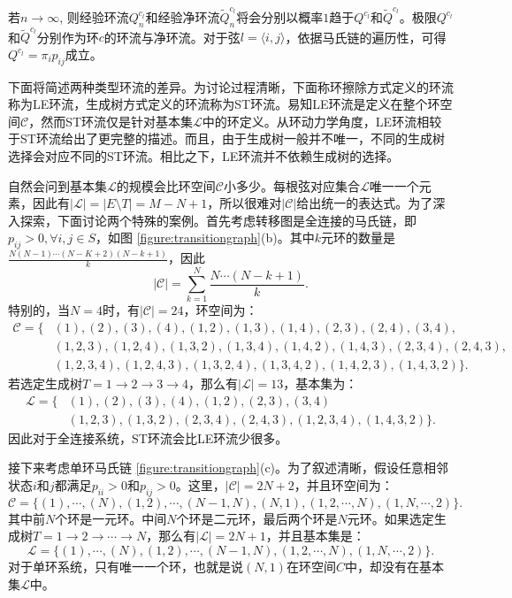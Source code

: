 若$n \to \infty$, 则经验环流$Q_n^{c_l}$和经验净环流$\tilde{Q}_n^{c_l}$将会分别以概率$1$趋于$Q^{c_l}$和$\tilde{Q}^{c_l}$。极限$Q^{c_l}$和$\tilde{Q}^{c_l}$分别作为环$c$的环流与净环流。对于弦$l=\langle i,j \rangle$，依据马氏链的遍历性，可得$Q^{c_l} = \pi_i p_{ij}$成立。

下面将简述两种类型环流的差异。为讨论过程清晰，下面称环擦除方式定义的环流称为LE环流，生成树方式定义的环流称为ST环流。易知LE环流是定义在整个环空间$\mathcal{C}$，然而ST环流仅是针对基本集$\mathcal{L}$中的环定义。从环动力学角度，LE环流相较于ST环流给出了更完整的描述。而且，由于生成树一般并不唯一，不同的生成树选择会对应不同的ST环流。相比之下，LE环流并不依赖生成树的选择。

自然会问到基本集$\mathcal{L}$的规模会比环空间$\mathcal{C}$小多少。每根弦对应集合$\mathcal{L}$唯一一个元素，因此有$|\mathcal{L}| = |E\setminus T| = M-N+1$，所以很难对$|\mathcal{C}|$给出统一的表达式。为了深入探索，下面讨论两个特殊的案例。首先考虑转移图是全连接的马氏链，即$p_{ij}>0, \forall i,j \in S$，如图 \ref{figure:transitiongraph}(b)。其中$k$元环的数量是$\frac{N (N-1) \cdots (N-K+2)(N-k+1)}{k}$，因此
\begin{equation*}
    |\mathcal{C}| = \sum_{k=1}^N\frac{N\cdots (N-k+1)}{k}.
\end{equation*}
特别的，当$N=4$时，有$|\mathcal{C}|=24$，环空间为：
\begin{align*}
    \mathcal{C} = \{&(1),(2),(3),(4),(1,2),(1,3),(1,4),(2,3),(2,4),(3,4),\\
    &(1,2,3),(1,2,4),(1,3,2),(1,3,4),(1,4,2),(1,4,3),(2,3,4),(2,4,3),\\
    &(1,2,3,4),(1,2,4,3),(1,3,2,4),(1,3,4,2),(1,4,2,3),(1,4,3,2)\}.
\end{align*}
若选定生成树$T = 1\to 2\to 3\to 4$，那么有$|\mathcal{L}|=13$，基本集为：
\begin{align*}
    \mathcal{L} = \{&(1),(2),(3),(4),(1,2),(2,3),(3,4)\\
    &(1,2,3),(1,3,2),(2,3,4),(2,4,3),(1,2,3,4),(1,4,3,2)\}.
\end{align*}
因此对于全连接系统，ST环流会比LE环流少很多。

接下来考虑单环马氏链 \ref{figure:transitiongraph}(c)。为了叙述清晰，假设任意相邻状态$i$和$j$都满足$p_{ii}>0$和$p_{ij}>0$。这里，$|\mathcal{C}| = 2N +2$，并且环空间为：
\begin{equation}\label{cycle_space}
    \mathcal{C} = \{(1),\cdots,(N),(1,2),\cdots,(N-1,N),(N,1),(1,2,\cdots,N),(1,N,\cdots,2)\}.
\end{equation}
其中前$N$个环是一元环。中间$N$个环是二元环，最后两个环是$N$元环。如果选定生成树$T = 1\to 2\to\cdots \to N$，那么有$|\mathcal{L}| = 2N + 1$，并且基本集是：
\begin{equation*}
    \mathcal{L} = \{(1),\cdots,(N),(1,2),\cdots,(N-1,N),(1,2,\cdots,N),(1,N,\cdots,2)\}.
\end{equation*}
对于单环系统，只有唯一一个环，也就是说$(N, 1)$在环空间$C$中，却没有在基本集$\mathcal{L}$中。

